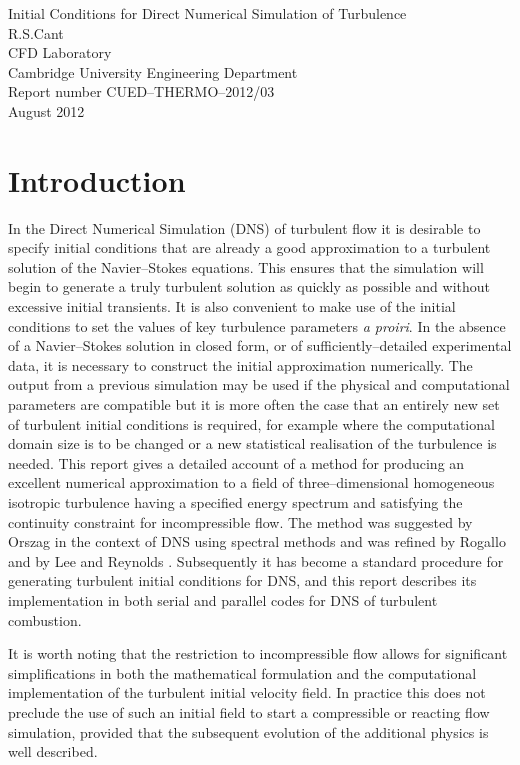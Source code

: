 \documentclass[dvips]{article}
\begin{document}
\vspace{40mm}
\begin{center}
{\Large Initial Conditions for Direct Numerical Simulation of
Turbulence}\\[10mm]
R.S.Cant\\
CFD Laboratory\\
Cambridge University Engineering Department\\[30mm]
Report number CUED--THERMO--2012/03\\
August 2012
\end{center}

\newpage
\section{Introduction}
In the Direct Numerical Simulation (DNS) of turbulent flow it is desirable
to specify initial conditions that are already a good approximation to a
turbulent solution of the Navier--Stokes equations.  This ensures that the
simulation will begin to generate a truly turbulent solution as quickly as
possible and without excessive initial transients.
It is also convenient to make use of the initial conditions to set the
values of key turbulence parameters {\it a proiri}.  In the absence
of a Navier--Stokes solution in closed form, or of sufficiently--detailed
experimental data, it is necessary to construct the initial approximation
numerically.  The output
from a previous simulation may be used if the physical and computational
parameters are compatible but it is more often the case that an entirely
new set of turbulent initial conditions is required, for example
where the computational domain size is to be changed or a new statistical
realisation of the turbulence is needed.  This report
gives a detailed account of a method for producing an excellent numerical 
approximation to a field of three--dimensional homogeneous isotropic turbulence
having a specified energy spectrum and satisfying the continuity constraint
for incompressible flow.  The method was suggested by Orszag \cite{orszaginit}
in the context of DNS using spectral methods and was refined by Rogallo
\cite{rogallo} and by Lee and Reynolds \cite{leereynolds}.
Subsequently it has become a standard procedure for generating turbulent
initial conditions for DNS, and this report describes its implementation
in both serial and parallel codes for DNS of turbulent combustion.

It is worth noting that the restriction to incompressible flow allows for
significant simplifications in both the mathematical formulation and the
computational implementation
of the turbulent initial velocity field.  
In practice this does not preclude the use of such an
initial field to start a compressible or reacting flow simulation,
provided that the subsequent evolution of the additional physics
is well described.
\end{document}
